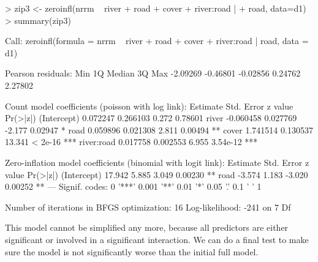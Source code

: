 \documentclass{article}
\begin{document}
\begin{Schunk}
\begin{Sinput}
> zip3 <- zeroinfl(nrrm ~ river + road + cover + river:road |
+                    road, data=d1)
> summary(zip3)
\end{Sinput}
\begin{Soutput}
Call:
zeroinfl(formula = nrrm ~ river + road + cover + river:road | road, data = d1)

Pearson residuals:
     Min       1Q   Median       3Q      Max 
-2.09269 -0.46801 -0.02856  0.24762  2.27802 

Count model coefficients (poisson with log link):
             Estimate Std. Error z value Pr(>|z|)    
(Intercept)  0.072247   0.266103   0.272  0.78601    
river       -0.060458   0.027769  -2.177  0.02947 *  
road         0.059896   0.021308   2.811  0.00494 ** 
cover        1.741514   0.130537  13.341  < 2e-16 ***
river:road   0.017758   0.002553   6.955 3.54e-12 ***

Zero-inflation model coefficients (binomial with logit link):
            Estimate Std. Error z value Pr(>|z|)   
(Intercept)   17.942      5.885   3.049  0.00230 **
road          -3.574      1.183  -3.020  0.00252 **
---
Signif. codes:  0 '***' 0.001 '**' 0.01 '*' 0.05 '.' 0.1 ' ' 1 

Number of iterations in BFGS optimization: 16 
Log-likelihood:  -241 on 7 Df
\end{Soutput}
\end{Schunk}

This model cannot be simplified any more, because all predictors are either significant or involved in a significant interaction. We can do a final test to make sure the model is not significantly worse than the initial full model.
\end{document}
